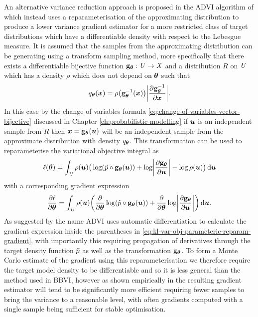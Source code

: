 An alternative variance reduction approach is proposed in the \ac{ADVI} algorithm of \citep{kucukelbir2016automatic} which instead uses a reparameterisation of the approximating distribution to produce a lower variance gradient estimator for a more restricted class of target distributions which have a differentiable density with respect to the Lebesgue measure.  It is assumed that the samples from the approximating distribution can be generating using a transform sampling method, more specifically that there exists a differentiable bijective function ${\mathbf{g}}_{\boldsymbol{\theta}} : \mathit{U} \to \mathit{X}$ and a distribution $R$ on $\mathit{U}$ which has a density $\rho$ which does not depend on $\boldsymbol{\theta}$ such that
\begin{equation}
  q_{\vct{\theta}}(\vct{x}) = \rho\lpa\vctfunc{g}_{\vct{\theta}}^{-1}(\vct{x})\rpa \left|\pd{\vctfunc{g}_{\vct{\theta}}^{-1}}{\vct{x}}\right|.
\end{equation}
In this case by the change of variables formula \eqref{eq:change-of-variables-vector-bijective} discussed in Chap\-ter \ref{ch:probabilistic-modelling} if $\boldsymbol{u}$ is an independent sample from $R$ then $\boldsymbol{x} = {\mathbf{g}}_{\boldsymbol{\theta}}(\boldsymbol{u})$ will be an independent sample from the approximate distribution with density $q_{\boldsymbol{\theta}}$. This transformation can be used to reparameterise the variational objective integral as
\begin{equation}\label{eq:kl-var-obj-parameteric-reparam}
  \ell(\vct{\theta}) = 
  \int_{\set{U}} \rho(\vct{u}) \big(
    \log\lpa\utgtdens\circ\vctfunc{g}_{\vct{\theta}}(\vct{u})\rpa +
    \log\left|\pd{\vctfunc{g}_{\vct{\theta}}}{\vct{u}}\right| - \log\rho(\vct{u})
  \big)
  \,\dr\vct{u}
\end{equation}
with a corresponding gradient expression
\begin{equation}\label{eq:kl-var-obj-parameteric-reparam-gradient}
  \pd{\ell}{\vct{\theta}} = 
  \int_{\set{U}} \rho(\vct{u}) \lpa
    \pd{}{\vct{\theta}}\log\lpa\utgtdens\circ\vctfunc{g}_{\vct{\theta}}(\vct{u})\rpa +
    \pd{}{\vct{\theta}}\log\left|\pd{\vctfunc{g}_{\vct{\theta}}}{\vct{u}}\right|
  \rpa
  \,\dr\vct{u}.
\end{equation}
As suggested by the name \ac{ADVI} uses automatic differentiation to calculate the gradient expression inside the parentheses in \eqref{eq:kl-var-obj-parameteric-reparam-gradient}, with importantly this requiring propagation of derivatives through the target density function $\tilde{p}$ as well as the transformation ${\mathbf{g}}_{\boldsymbol{\theta}}$. To form a Monte Carlo estimate of the gradient using this reparameterisation we therefore require the target model density to be differentiable and so it is less general than the method used in \ac{BBVI}, however as shown empirically in \citep{kucukelbir2016automatic} the resulting gradient estimator will tend to be significantly more efficient requiring fewer samples to bring the variance to a reasonable level, with often gradients computed with a single sample being sufficient for stable optimisation.


